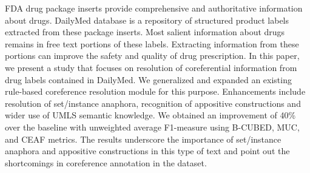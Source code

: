 FDA drug package inserts provide comprehensive and authoritative information about drugs. DailyMed database is a repository of structured product labels extracted from these package inserts. Most salient information about drugs remains in free text portions of these labels. Extracting information from these portions can improve the safety and quality of drug prescription. In this paper, we present a study that focuses on resolution of coreferential information from drug labels contained in DailyMed. We generalized and expanded an existing rule-based coreference resolution module for this purpose. Enhancements include resolution of set/instance anaphora, recognition of appositive constructions and wider use of UMLS semantic knowledge. We obtained an improvement of 40\% over the baseline with unweighted average F1-measure using B-CUBED, MUC, and CEAF metrics. The results underscore the importance of set/instance anaphora and appositive constructions in this type of text and point out the shortcomings in coreference annotation in the dataset.
